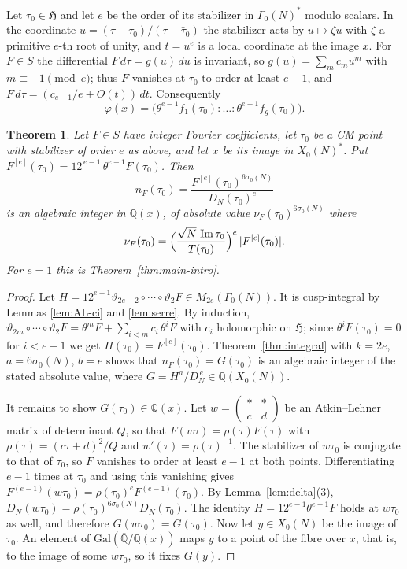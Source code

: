 \documentclass[11pt]{amsart}
\newtheorem{theorem}{Theorem}[section]
\theoremstyle{definition}
\theoremstyle{remark}
\newcommand{\Q}{\mathbb{Q}}
\newcommand{\HH}{\mathfrak{H}}
\newcommand{\Qbar}{\overline{\Q}}
\newcommand{\im}{\operatorname{Im}}
\newcommand{\sz}{\sigma_0}
\newcommand{\Xs}{X_0(N)^*}
\newcommand{\Gs}{\Gamma_0(N)^*}
\newcommand{\smat}[4]{\left(\begin{smallmatrix}#1&#2\\#3&#4\end{smallmatrix}\right)}
\begin{document}
Let $\tau_0\in\HH$ and let $e$ be the order of its stabilizer in $\Gs$ modulo
scalars.  In the coordinate $u=(\tau-\tau_0)/(\tau-\bar\tau_0)$ the stabilizer
acts by $u\mapsto\zeta u$ with $\zeta$ a primitive $e$-th root of unity, and
$t=u^e$ is a local coordinate at the image $x$.  For $F\in S$ the differential
$F\,d\tau=g(u)\,du$ is invariant, so $g(u)=\sum_mc_mu^m$ with
$m\equiv-1\pmod e$; thus $F$ vanishes at $\tau_0$ to order at least $e-1$, and
$F\,d\tau=(c_{e-1}/e+O(t))\,dt$.  Consequently
\begin{equation}\label{eq:phi-ell}
\varphi(x)=\bigl(\theta^{e-1}f_1(\tau_0):\dots:\theta^{e-1}f_g(\tau_0)\bigr).
\end{equation}

\begin{theorem}\label{thm:elliptic}
Let $F\in S$ have integer Fourier coefficients, let $\tau_0$ be a CM point with
stabilizer of order $e$ as above, and let $x$ be its image in $\Xs$.  Put
$F^{[e]}(\tau_0)=12^{\,e-1}\,\theta^{e-1}F(\tau_0)$.  Then
\[
n_F(\tau_0)=\frac{F^{[e]}(\tau_0)^{6\sz(N)}}{D_N(\tau_0)^{e}}
\]
is an algebraic integer in $\Q(x)$, of absolute value $\nu_F(\tau_0)^{6\sz(N)}$
where
\[
\nu_F(\tau_0)=\Bigl(\frac{\sqrt N\,\im\tau_0}{T(\tau_0)}\Bigr)^{e}\,\lvert F^{[e]}(\tau_0)\rvert .
\]
For $e=1$ this is Theorem~\ref{thm:main-intro}.
\end{theorem}
\begin{proof}
Let $H=12^{e-1}\vartheta_{2e-2}\circ\cdots\circ\vartheta_2F\in M_{2e}(\Gamma_0(N))$.
It is cusp-integral by Lemmas \ref{lem:AL-ci} and \ref{lem:serre}.  By induction,
$\vartheta_{2m}\circ\cdots\circ\vartheta_2F=\theta^mF+\sum_{i<m}c_i\,\theta^iF$
with $c_i$ holomorphic on $\HH$; since $\theta^iF(\tau_0)=0$ for $i<e-1$ we get
$H(\tau_0)=F^{[e]}(\tau_0)$.  Theorem~\ref{thm:integral} with $k=2e$,
$a=6\sz(N)$, $b=e$ shows that $n_F(\tau_0)=G(\tau_0)$ is an algebraic integer of
the stated absolute value, where $G=H^a/D_N^{\,e}\in\Q(X_0(N))$.

It remains to show $G(\tau_0)\in\Q(x)$.  Let $w=\smat{*}{*}{c}{d}$ be an
Atkin--Lehner matrix of determinant $Q$, so that
$F(w\tau)=\rho(\tau)F(\tau)$ with $\rho(\tau)=(c\tau+d)^2/Q$ and
$w'(\tau)=\rho(\tau)^{-1}$.  The stabilizer of $w\tau_0$ is conjugate to that of
$\tau_0$, so $F$ vanishes to order at least $e-1$ at both points.
Differentiating $e-1$ times at $\tau_0$ and using this vanishing gives
$F^{(e-1)}(w\tau_0)=\rho(\tau_0)^{e}F^{(e-1)}(\tau_0)$.  By
Lemma~\ref{lem:delta}(3), $D_N(w\tau_0)=\rho(\tau_0)^{6\sz(N)}D_N(\tau_0)$.
The identity $H=12^{e-1}\theta^{e-1}F$ holds at $w\tau_0$ as well, and therefore $G(w\tau_0)=G(\tau_0)$.
Now let $y\in X_0(N)$ be the image of $\tau_0$.  An element of
$\mathrm{Gal}(\Qbar/\Q(x))$ maps $y$ to a point of the fibre over $x$, that is, to
the image of some $w\tau_0$, so it fixes $G(y)$.
\end{proof}
\end{document}
